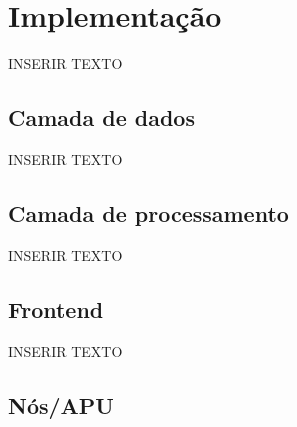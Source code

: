 \chapter{Implementação}
\label{chp:implement}

INSERIR TEXTO

\section{Camada de dados}
INSERIR TEXTO

\section{Camada de processamento}
INSERIR TEXTO

\section{Frontend}
INSERIR TEXTO

\section{Nós/APU}